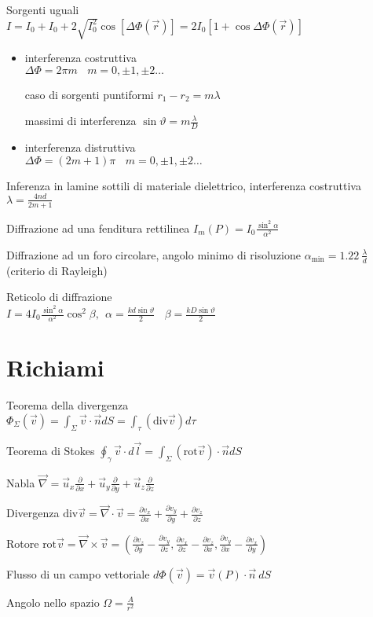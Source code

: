 \documentclass[10pt,a4paper]{article}
\begin{document}
\begin{multicols}{2}
Sorgenti uguali \\$I=I_{0} +I_{0} +2\sqrt{I^{2}_{0}}\cos[ \Delta \Phi (\vec{r} )] =2I_{0}[ 1+\cos \Delta \Phi (\vec{r} )]$
\begin{itemize}
\item interferenza costruttiva \\$\Delta \Phi =2\pi m\ \ \ \ m=0,\pm 1,\pm 2\dotsc $

caso di sorgenti puntiformi $r_{1} -r_{2} =m\lambda $

massimi di interferenza $\sin \vartheta =m\frac{\lambda }{D}$
\item interferenza distruttiva \\$\Delta \Phi =(2m+1)\pi \ \ \ \ m=0,\pm 1,\pm 2\dotsc $
\end{itemize}

Inferenza in lamine sottili di materiale dielettrico, interferenza costruttiva $\lambda =\frac{4nd}{2m+1}$

Diffrazione ad una fenditura rettilinea $I_{m} (P)=I_{0}\frac{\sin^{2} \alpha }{\alpha ^{2}}$

Diffrazione ad un foro circolare, angolo minimo di risoluzione $\alpha _{\text{min}} =1.22\ \frac{\lambda }{d}$ (criterio di Rayleigh)

Reticolo di diffrazione \\$I=4I_{0}\frac{\sin^{2} \alpha }{\alpha ^{2}}\cos^{2} \beta ,\ \ \alpha =\frac{kd\sin \vartheta }{2} \ \ \ \ \beta =\frac{kD\sin \vartheta }{2}$
\section*{Richiami}

Teorema della divergenza \\$\Phi _{\Sigma } (\vec{v} )=\int _{\Sigma }\vec{v} \cdot \vec{n} dS=\int _{\tau } (\text{div}\vec{v} )d\tau $

Teorema di Stokes $\oint _{\gamma }\vec{v} \cdot d\vec{l} =\int _{\Sigma } (\text{rot}\vec{v} )\cdot \vec{n} dS$

Nabla $\vec{\nabla } =\vec{u}_{x}\frac{\partial }{\partial x} +\vec{u}_{y}\frac{\partial }{\partial y} +\vec{u}_{z}\frac{\partial }{\partial z}$

Divergenza $\text{div}\vec{v} =\vec{\nabla } \cdot \vec{v} =\frac{\partial v_{x}}{\partial x} +\frac{\partial v_{y}}{\partial y} +\frac{\partial v_{z}}{\partial z}$

Rotore $\text{rot}\vec{v} =\vec{\nabla } \times \vec{v} =\left(\frac{\partial v_{z}}{\partial y} -\frac{\partial v_{y}}{\partial z} ,\frac{\partial v_{x}}{\partial z} -\frac{\partial v_{z}}{\partial x} ,\frac{\partial v_{y}}{\partial x} -\frac{\partial v_{x}}{\partial y}\right)$

Flusso di un campo vettoriale $d\Phi (\vec{v} )=\vec{v} (P)\cdot \vec{n} \ dS$

Angolo nello spazio $\Omega =\frac{A}{r^{2}}$

\end{multicols}
\end{document}
